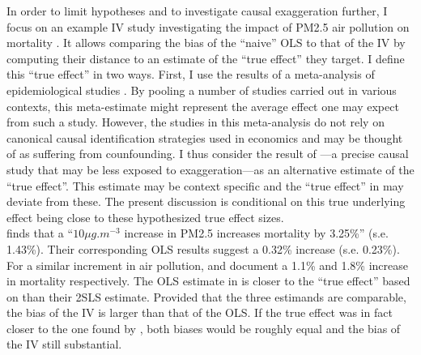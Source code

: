 \documentclass[usletter, 12pt]{article}
\begin{document}
		In order to limit hypotheses and to investigate causal exaggeration further, I focus on an example IV study investigating the impact of PM2.5 air pollution on mortality \citep{he_straw_2020}. It allows comparing the bias of the ``naive'' OLS to that of the IV by computing their distance to an estimate of the ``true effect'' they target. %
		I define this ``true effect'' in two ways. First, I use the results of a meta-analysis of epidemiological studies \citep{shah_short_2015}. By pooling a number of studies carried out in various contexts, this meta-estimate might represent the average effect one may expect from such a study.  However, the studies in this meta-analysis do not rely on canonical causal identification strategies used in economics and may be thought of as suffering from counfounding. I thus consider the result of \cite{deryugina_mortality_2019}---a precise causal study that may be less exposed to exaggeration---as an alternative estimate of the ``true effect''. This estimate may be context specific and the ``true effect'' in %
		\cite{he_straw_2020} may deviate from these. 
		The present discussion is conditional on this true underlying effect being close to these hypothesized true effect sizes.\\
		
		\cite{he_straw_2020} finds that a ``$10 \mu g.m^{-3}$ increase in PM2.5 increases mortality by 3.25\%'' (s.e. 1.43\%). Their corresponding OLS results suggest a 0.32\% increase (s.e. 0.23\%). 
For a similar increment in air pollution, \cite{shah_short_2015} and \cite{deryugina_mortality_2019} document a 1.1\% and 1.8\% increase in mortality respectively. The OLS estimate in \cite{he_straw_2020} is closer to the ``true effect'' based on \cite{shah_short_2015} than their 2SLS estimate. Provided that the three estimands are comparable, the bias of the IV is larger than that of the OLS. If the true effect was in fact closer to the one found by \cite{deryugina_mortality_2019}, both biases would be roughly equal and the bias of the IV still substantial.
		
\end{document}
